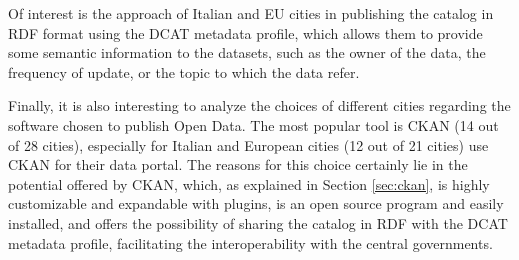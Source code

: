 Of interest is the approach of Italian and EU cities in publishing the catalog in \ac{RDF} format using the DCAT metadata profile, which allows them to provide some semantic information to the datasets, such as the owner of the data, the frequency of update, or the topic to which the data refer.

Finally, it is also interesting to analyze the choices of different cities regarding the software chosen to publish Open Data. The most popular tool is CKAN (14 out of 28 cities), especially for Italian and European cities (12 out of 21 cities) use CKAN for their data portal. The reasons for this choice certainly lie in the potential offered by CKAN, which, as explained in Section \ref{sec:ckan}, is highly customizable and expandable with plugins, is an open source program and easily installed, and offers the possibility of sharing the catalog in \ac{RDF} with the DCAT metadata profile, facilitating the interoperability with the central governments.